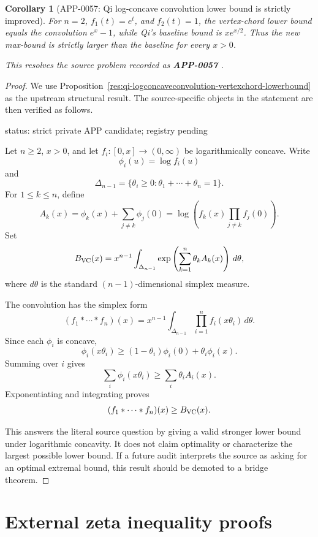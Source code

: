 \documentclass[11pt]{article}
\numberwithin{equation}{section}
\newtheorem{corollary}[theorem]{Corollary}
\theoremstyle{definition}
\theoremstyle{remark}
\newcommand{\1}{\mathbf 1}
\begin{document}
\begin{corollary}[APP-0057: Qi log-concave convolution lower bound is strictly improved]
\label{res:qi-logconcaveconvolution-strictimprovement-example}
For \(n=2\), \(f_1(t)=e^t\), and \(f_2(t)=1\), the vertex-chord lower bound equals the convolution \(e^x-1\), while Qi's baseline bound is \(xe^{x/2}\). Thus the new max-bound is strictly larger than the baseline for every \(x>0\).



This resolves the source problem recorded as \textbf{APP-0057} \cite{qi-hlambda}.
\end{corollary}

\begin{proof}
We use Proposition~\ref{res:qi-logconcaveconvolution-vertexchord-lowerbound} as the upstream structural result. The source-specific objects in the statement are then verified as follows.

status: strict private APP candidate; registry pending

Let \(n\ge2\), \(x>0\), and let \(f_i:[0,x]\to(0,\infty)\) be logarithmically concave. Write
\[
\phi_i(u)=\log f_i(u)
\]
and
\[
\Delta_{n-1}=\{\theta_i\ge0:\theta_1+\cdots+\theta_n=1\}.
\]
For \(1\le k\le n\), define
\[
A_k(x)=\phi_k(x)+\sum_{j\ne k}\phi_j(0)
=\log\left(f_k(x)\prod_{j\ne k}f_j(0)\right).
\]
Set
\[
B_{\rm VC}(x)=x^{n-1}\int_{\Delta_{n-1}}
\exp\left(\sum_{k=1}^n\theta_kA_k(x)\right)\,d\theta,
\]
where \(d\theta\) is the standard \((n-1)\)-dimensional simplex measure.

The convolution has the simplex form
\[
(f_1*\cdots*f_n)(x)
=x^{n-1}\int_{\Delta_{n-1}}\prod_{i=1}^n f_i(x\theta_i)\,d\theta.
\]
Since each \(\phi_i\) is concave,
\[
\phi_i(x\theta_i)\ge (1-\theta_i)\phi_i(0)+\theta_i\phi_i(x).
\]
Summing over \(i\) gives
\[
\sum_i\phi_i(x\theta_i)\ge\sum_i\theta_i A_i(x).
\]
Exponentiating and integrating proves
\[
(f_1*\cdots*f_n)(x)\ge B_{\rm VC}(x).
\]

This answers the literal source question by giving a valid stronger lower bound under logarithmic concavity. It does not claim optimality or characterize the largest possible lower bound. If a future audit interprets the source as asking for an optimal extremal bound, this result should be demoted to a bridge theorem.
\end{proof}

\section{External zeta inequality proofs}
\end{document}
